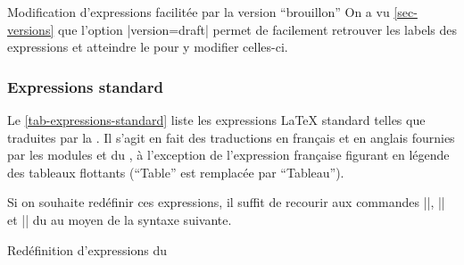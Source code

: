 \begin{dbremark}{Modification d'expressions facilitée par la version
    \enquote{brouillon}}{}
  On a vu \vref{sec-versions} que l'option |version=draft| permet de facilement
  retrouver les labels des expressions et atteindre le \File{\configurationfile}
  pour y modifier celles-ci.
\end{dbremark}

\subsubsection{Expressions standard}
\label{sec-expressions-standard}

Le \vref{tab-expressions-standard} liste les expressions \LaTeX{} standard
telles que traduites par la \yatCl{}. Il s'agit en fait des traductions en
français et en anglais fournies par les modules  et
 du , à l'exception de l'expression française
figurant en légende des tableaux flottants (\enquote{Table} est remplacée par
\enquote{Tableau}).%
%

Si on souhaite redéfinir ces expressions, il suffit de recourir aux commandes
|\addto|, |\captionsfrench| et |\captionsenglish| du  au moyen
de la syntaxe suivante.

\begin{preamblecode}[title=Par exemple dans le \File{\configurationfile}]
\addto{}
\addto{}
\end{preamblecode}
\begin{table}[hb]
  \centering
  \caption{Valeurs et commandes d'expressions \LaTeX{} standard fournies par la \yatCl{}}
  \label{tab-expressions-standard}
  
\end{table}
\begin{dbexample}{Redéfinition d'expressions du }{}
\begin{preamblecode}[title=Par exemple dans le \File{\configurationfile}]
\addto{}
\addto{}
\end{preamblecode}
\end{dbexample}

